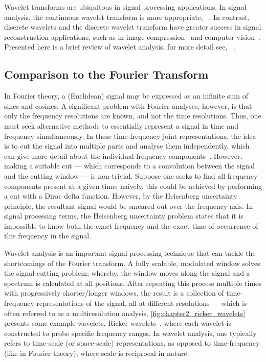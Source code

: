 Wavelet transforms are ubiquitous in signal processing applications.
In signal analysis, the continuous wavelet transform is more appropriate, \eg{}~\cite{Goupillaud1984,KronlandMartinet1987,Flandrin1989,Holschneider1990,Bertrand1990,Pierce1991}.
In contrast, discrete wavelets and the discrete wavelet transform have greater success in signal reconstruction applications, such as in image compression~\cite{Antonini1990,Mallat1992} and computer vision~\cite{Mallat1989,Shensa1992}.
Presented here is a brief review of wavelet analysis, for more detail see, \eg{}~\cite{Rioul1991,Graps1995,Addison2005,Valens1999,Kaiser2011}.

\subsection{Comparison to the Fourier Transform}\label{sec:chapter2_comparison_fourier_transform}

In Fourier theory, a (Euclidean) signal may be expressed as an infinite sum of sines and cosines.
A significant problem with Fourier analyses, however, is that only the frequency resolutions are known, and not the time resolutions.
Thus, one must seek alternative methods to essentially represent a signal in time and frequency simultaneously.
In these time-frequency joint representations, the idea is to cut the signal into multiple parts and analyse them independently, which can give more detail about the individual frequency components~\cite{Mallat2008}.
However, making a suitable cut --- which corresponds to a convolution between the signal and the cutting window --- is non-trivial.
Suppose one seeks to find all frequency components present at a given time; naively, this could be achieved by performing a cut with a Dirac delta function.
However, by the Heisenberg uncertainty principle, the resultant signal would be smeared out over the frequency axis.
In signal processing terms, the Heisenberg uncertainty problem states that it is impossible to know both the exact frequency and the exact time of occurrence of this frequency in the signal.

Wavelet analysis is an important signal processing technique that can tackle the shortcomings of the Fourier transform.
A fully scalable, modulated window solves the signal-cutting problem; whereby, the window moves along the signal and a spectrum is calculated at all positions.
After repeating this process multiple times with progressively shorter/longer windows, the result is a collection of time-frequency representations of the signal, all at different resolutions --- which is often referred to as a multiresolution analysis.
\cref{fig:chapter2_ricker_wavelets} presents some example wavelets, Ricker wavelets~\cite{Ricker1953}, where each wavelet is constructed to probe specific frequency ranges.
In wavelet analysis, one typically refers to time-scale (or space-scale) representations, as opposed to time-frequency (like in Fourier theory), where scale is reciprocal in nature.

